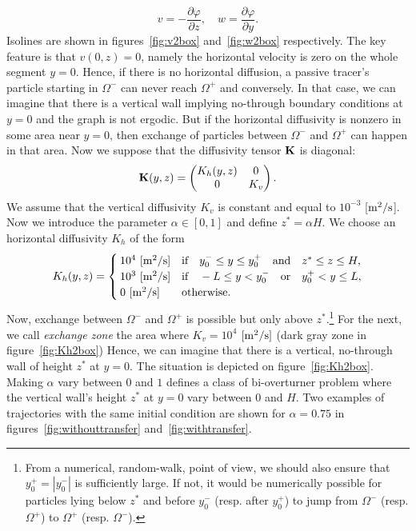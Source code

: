 \begin{equation} \label{eq:u-psi_2box}
	v = -\frac{\partial \varphi}{\partial z}, \quad w = \frac{\partial  \varphi}{\partial y}.
\end{equation}
 Isolines are shown in figures~\ref{fig:v2box} and~\ref{fig:w2box} respectively. The key feature is that $v(0,z) = 0$, namely the horizontal velocity is zero on the whole segment $y = 0$. Hence, if there is no horizontal diffusion, a passive tracer's particle starting in $\Omega^-$ can never reach $\Omega^+$ and conversely. In that case, we can imagine that there is a vertical wall implying no-through boundary conditions at $y=0$ and the graph is not ergodic. But if the horizontal diffusivity is nonzero in some area near $y=0$, then exchange of particles between $\Omega^-$ and $\Omega^+$ can happen in that area. Now we suppose that the diffusivity tensor $\b K$ is diagonal:
 \begin{equation}
 	\b K(y,z) = \begin{pmatrix} K_h(y,z) & 0\\ 0 & K_v \end{pmatrix}.  	
 \end{equation} 
We assume that the vertical diffusivity $K_v$ is constant and equal to $10^{-3}$ [$\rm{m^2/s}$]. Now we introduce the parameter $\alpha \in [0,1]$ and define $z^* = \alpha H$. We choose an horizontal diffusivity $K_h$ of the form
\begin{equation} \label{eq:Kh2box}
	K_h(y,z) = \begin{cases}
			10^4\ \rm{[m^2/s]} & \mbox{if} \quad y_0^- \le y \le y_0^+ \quad \mbox{and} \quad z^* \le z \le H,\\
			10^3\ \rm{[m^2/s]} & \mbox{if} \quad -L \le y < y_0^- \quad \mbox{or} \quad y_0^+ < y \le L,\\
			0\ \rm{[m^2/s]}  & \mbox{otherwise}.
		\end{cases}
\end{equation}
Now, exchange between $\Omega^-$ and $\Omega^+$ is possible but only above $z^*$.\footnote{From a numerical, random-walk, point of view, we should also ensure that $y_0^+ = |y_0^-|$ is sufficiently large. If not, it would be numerically possible for particles lying below $z^*$ and before $y_0^-$ (resp. after $y_0^+$) to jump from $\Omega^-$ (resp. $\Omega^+$) to $\Omega^+$ (resp. $\Omega^-$).} For the next, we call \textit{exchange zone} the area where $K_v = 10^4$ $\rm{[m^2/s]}$ (dark gray zone in figure~\ref{fig:Kh2box}) Hence, we can imagine that there is a vertical, no-through wall of height $z^*$ at $y=0$. The situation is depicted on figure~\ref{fig:Kh2box}. Making $\alpha$ vary between $0$ and $1$ defines a class of bi-overturner problem where the vertical wall's height $z^*$ at $y=0$ vary between $0$ and $H$. Two examples of trajectories with the same initial condition are shown for $\alpha = 0.75$ in figures~\ref{fig:withouttransfer} and~\ref{fig:withtransfer}.

